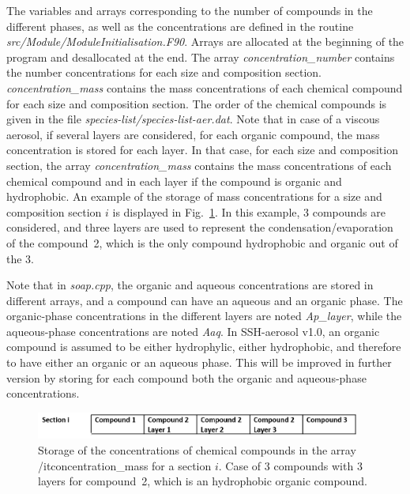 \documentclass[a4paper,11pt]{article}
\begin{document}
The variables and arrays corresponding to the number of compounds in the different
phases, as well as the concentrations are defined in the routine
{\textit{src/Module/ModuleInitialisation.F90}}. Arrays are allocated at the
beginning of the program and desallocated at the end. The array
\textit{concentration\_number} contains the number concentrations for each size
and composition section. \textit{concentration\_mass} contains the mass
concentrations of each chemical compound for each size
and composition section. The order of the chemical compounds is given in the
file \textit{species-list/species-list-aer.dat}. Note that in case of a
viscous aerosol, if several layers are considered, for each organic
compound, the mass concentration is stored for each layer. In that case, for each
size and composition section, the array \textit{concentration\_mass} contains
the mass concentrations of each chemical compound and in each layer if the
compound is organic and hydrophobic. An example of the storage of mass concentrations for a size and composition section $i$ is displayed in Fig.~\ref{fig-array}. In this example, 3 compounds are considered, and three layers are used to represent the condensation/evaporation of the compound~2, which is the only compound hydrophobic and organic out of the 3.

Note that in \textit{soap.cpp}, the organic and aqueous concentrations are stored in different arrays, and a compound can have an aqueous and an organic phase. The organic-phase concentrations in the different layers are
noted \textit{Ap\_layer}, while the aqueous-phase concentrations  are
noted \textit{Aaq}. 
In SSH-aerosol v1.0, an organic compound is assumed to be either hydrophylic,
either hydrophobic, and therefore to have either an organic or an aqueous phase. This will be improved in further version by storing for
each compound both the organic and aqueous-phase concentrations.

\begin{figure}[H]
        \begin{center}
                \includegraphics[angle=0,width=0.95\textwidth]{array.png}
        \end{center}
\caption{Storage of the concentrations of chemical compounds in the array {/it{concentration\_mass}} for a section $i$. Case of 3 compounds with 3 layers for compound~2, which is an hydrophobic organic compound.}
\label{fig-array}
\end{figure}
\end{document}
